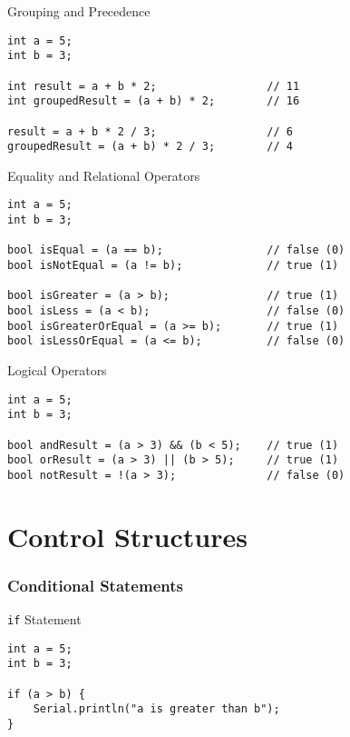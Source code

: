 \documentclass[sectionframe]{oxblue-beamer}
\begin{document}
\begin{frame}[fragile]{Grouping and Precedence}
\begin{verbatim}
int a = 5;
int b = 3;

int result = a + b * 2;                 // 11
int groupedResult = (a + b) * 2;        // 16

result = a + b * 2 / 3;                 // 6
groupedResult = (a + b) * 2 / 3;        // 4
\end{verbatim}
\end{frame}

\begin{frame}[fragile]{Equality and Relational Operators}
\begin{verbatim}
int a = 5;
int b = 3;

bool isEqual = (a == b);                // false (0)
bool isNotEqual = (a != b);             // true (1)

bool isGreater = (a > b);               // true (1)
bool isLess = (a < b);                  // false (0)
bool isGreaterOrEqual = (a >= b);       // true (1)
bool isLessOrEqual = (a <= b);          // false (0)
\end{verbatim}
\end{frame}

\begin{frame}[fragile]{Logical Operators}
\begin{verbatim}
int a = 5;
int b = 3;

bool andResult = (a > 3) && (b < 5);    // true (1)
bool orResult = (a > 3) || (b > 5);     // true (1)
bool notResult = !(a > 3);              // false (0)
\end{verbatim}
\end{frame}

\section{Control Structures}

\subsubsection{Conditional Statements}

\begin{frame}[fragile]{\texttt{if} Statement}
\begin{verbatim}
int a = 5;
int b = 3;

if (a > b) {
    Serial.println("a is greater than b");
}
\end{verbatim}
\end{frame}
\end{document}
